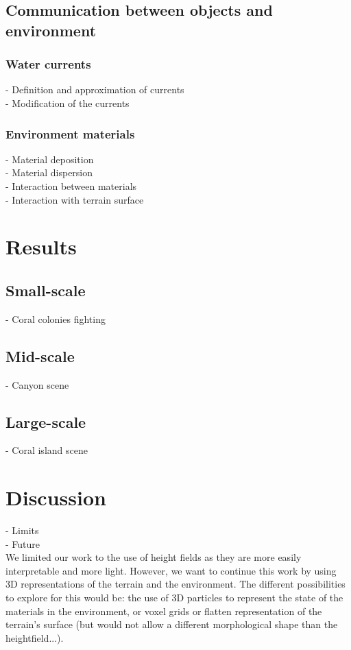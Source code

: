 \documentclass{egpubl}
\begin{document}
\subsection{Communication between objects and environment}
\subsubsection{Water currents}
- Definition and approximation of currents \\
- Modification of the currents \\

\subsubsection{Environment materials}
- Material deposition \\
- Material dispersion \\
- Interaction between materials \\
- Interaction with terrain surface \\


\section{Results}
\subsection{Small-scale}
- Coral colonies fighting \\

\subsection{Mid-scale}
- Canyon scene \\

\subsection{Large-scale}
- Coral island scene\\



\section{Discussion}
- Limits \\

- Future \\
We limited our work to the use of height fields as they are more easily interpretable and more light. However, we want to continue this work by using 3D representations of the terrain and the environment. The different possibilities to explore for this would be: the use of 3D particles to represent the state of the materials in the environment, or voxel grids or flatten representation of the terrain's surface (but would not allow a different morphological shape than the heightfield...).
\end{document}
